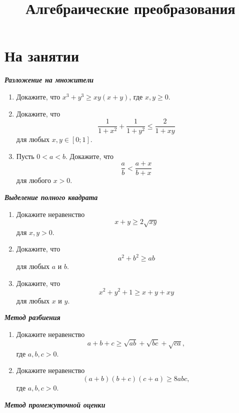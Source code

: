 \documentclass[a4paper,12pt,leqno]{article}
\title{\textbf{Алгебраические преобразования}}
\date{}
\theoremstyle{plain} %
\theoremstyle{definition} %
\theoremstyle{remark} %
\begin{document}
	\fontsize{14}{16pt}\selectfont
	\parskip=0mm
	\linespread{1}
	\maketitle
	
	
	\newcommand{\z}{\addtocounter{zadacha}{1}%
		\boxed{\arabic{zadacha}} }
	\section*{На занятии}
	\textbf{\textit{Разложение на множители}}
	\begin{enumerate}
		\item[\z] Докажите, что $x^3 + y^3 \geqslant xy(x+y)$, где $x, y \geq 0$.
		
		\item[\z] Докажите, что $$\frac{1}{1+x^2} + \frac{1}{1+y^2} \leqslant \frac{2}{1+xy}$$ для любых $x, y \in [0; 1]$.
		
		\item[\z] Пусть $0 < a < b$. Докажите, что $$\frac{a}{b} < \frac{a+x}{b+x}$$ для любого $x > 0$.
		
	\end{enumerate}
	
	\textbf{\textit{Выделение полного квадрата}}
	
	\begin{enumerate}
		\item[\z] Докажите неравенство $$x + y \geqslant 2\sqrt{xy}$$ для $x, y > 0$.
		
		\item[\z] Докажите, что $$a^2+b^2 \geqslant ab$$ для любых $a$ и $b$.
		
		\item[\z] Докажите, что $$x^2+y^2+1 \geqslant x + y + xy$$ для любых $x$ и $y$.
	\end{enumerate}
	
	\textbf{\textit{Метод разбиения}}
	
	\begin{enumerate}
		\item[\z] Докажите неравенство $$a+b+c \geqslant \sqrt{ab} + \sqrt{bc} + \sqrt{ca} ,$$
		где $a, b, c > 0$. 
		\newpage
		\item[\z] Докажите неравенство $$(a+b)(b+c)(c+a) \geqslant 8abc ,$$
		где $a, b, c > 0$.
	\end{enumerate}
	
	\textbf{\textit{Метод промежуточной оценки}}
	
\end{document}
